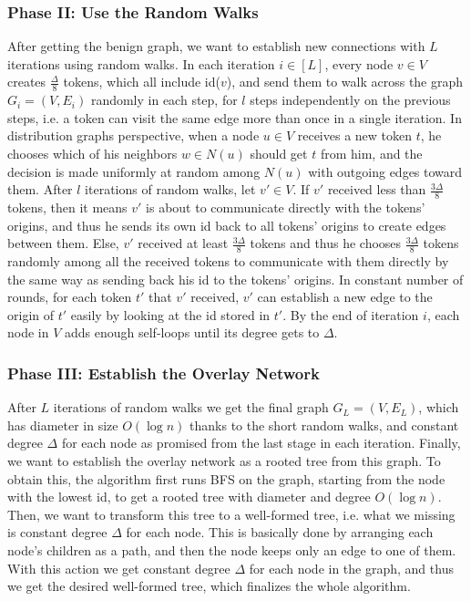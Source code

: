 \documentclass[11pt]{article}
\begin{document}
\subsubsection{Phase II: Use the Random Walks}
After getting the benign graph, we want to establish new connections with $L$ iterations using random walks. In each iteration $i\in[L]$, every node $v\in V$ creates $\frac{\Delta}{8}$ tokens, which all include id($v$), and send them to walk across the graph $G_{i}=(V,E_{i})$ randomly in each step, for $l$ steps independently on the previous steps, i.e. a token can visit the same edge more than once in a single iteration. In distribution graphs perspective, when a node $u \in V$ receives a new token $t$, he chooses which of his neighbors $w \in N(u)$ should get $t$ from him, and the decision is made uniformly at random among $N(u)$ with outgoing edges toward them. After $l$ iterations of random walks, let $v' \in V$. If $v'$ received less than $\frac{3\Delta}{8}$ tokens, then it means $v'$ is about to communicate directly with the tokens' origins, and thus he sends its own id back to all tokens' origins to create edges between them. Else, $v'$ received at least $\frac{3\Delta}{8}$ tokens and thus he chooses $\frac{3\Delta}{8}$ tokens randomly among all the received tokens to communicate with them directly by the same way as sending back his id to the tokens' origins. In constant number of rounds, for each token $t'$ that $v'$ received, $v'$ can establish a new edge to the origin of $t'$ easily by looking at the id stored in $t'$. By the end of iteration $i$, each node in $V$ adds enough self-loops until its degree gets to $\Delta$.

\subsubsection{Phase III: Establish the Overlay Network}
After $L$ iterations of random walks we get the final graph $G_{L}=(V,E_{L})$, which has diameter in size $O(\log{n})$ thanks to the short random walks, and constant degree $\Delta$ for each node as promised from the last stage in each iteration. Finally, we want to establish the overlay network as a rooted tree from this graph. To obtain this, the algorithm first runs BFS on the graph, starting from the node with the lowest id, to get a rooted tree with diameter and degree $O(\log{n})$. Then, we want to transform this tree to a well-formed tree, i.e. what we missing is constant degree $\Delta$ for each node. This is basically done by arranging each node's children as a path, and then the node keeps only an edge to one of them. With this action we get constant degree $\Delta$ for each node in the graph, and thus we get the desired well-formed tree, which finalizes the whole algorithm.

%
%
\end{document}

